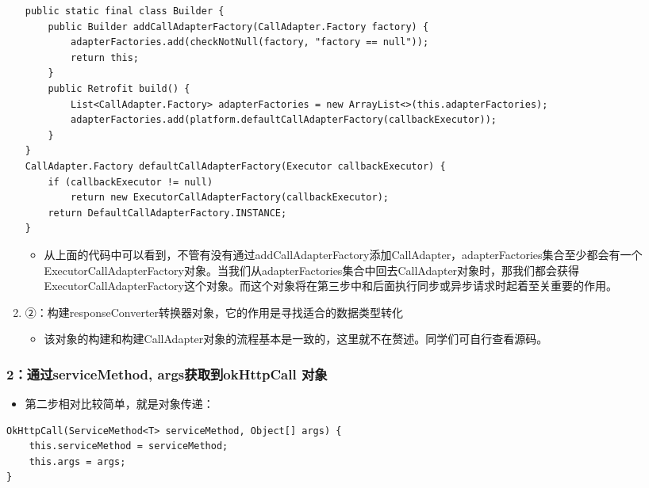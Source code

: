 \documentclass[9pt, b5paper]{article}
\begin{document}
\begin{enumerate}
\begin{itemize}
\end{itemize}
\begin{verbatim}
public static final class Builder {
    public Builder addCallAdapterFactory(CallAdapter.Factory factory) {
        adapterFactories.add(checkNotNull(factory, "factory == null"));
        return this;
    }
    public Retrofit build() {
        List<CallAdapter.Factory> adapterFactories = new ArrayList<>(this.adapterFactories);
        adapterFactories.add(platform.defaultCallAdapterFactory(callbackExecutor));
    }  
}
CallAdapter.Factory defaultCallAdapterFactory(Executor callbackExecutor) {
    if (callbackExecutor != null) 
        return new ExecutorCallAdapterFactory(callbackExecutor);
    return DefaultCallAdapterFactory.INSTANCE;
}
\end{verbatim}
\begin{itemize}
\item 从上面的代码中可以看到，不管有没有通过addCallAdapterFactory添加CallAdapter，adapterFactories集合至少都会有一个ExecutorCallAdapterFactory对象。当我们从adapterFactories集合中回去CallAdapter对象时，那我们都会获得ExecutorCallAdapterFactory这个对象。而这个对象将在第三步中和后面执行同步或异步请求时起着至关重要的作用。
\end{itemize}
\item ②：构建responseConverter转换器对象，它的作用是寻找适合的数据类型转化
\label{sec-1-3-1-2}
\begin{itemize}
\item 该对象的构建和构建CallAdapter对象的流程基本是一致的，这里就不在赘述。同学们可自行查看源码。
\end{itemize}
\end{enumerate}
\subsubsection{2：通过serviceMethod, args获取到okHttpCall 对象}
\label{sec-1-3-2}
\begin{itemize}
\item 第二步相对比较简单，就是对象传递：
\end{itemize}
\begin{verbatim}
OkHttpCall(ServiceMethod<T> serviceMethod, Object[] args) {
    this.serviceMethod = serviceMethod;
    this.args = args;
}
\end{verbatim}
\end{document}
